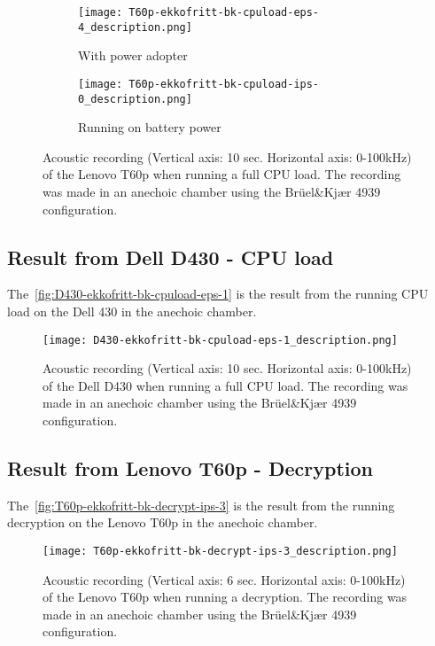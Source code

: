 \begin{figure}[ht]
	\begin{subfigure}{0.5\textwidth}
	    \centering
	    \texttt{[image: T60p-ekkofritt-bk-cpuload-eps-4\_description.png]}
	    \caption{With power adopter}
	    \label{fig:T60p-ekkofritt-bk-cpuload-eps-4}
    \end{subfigure}
    \begin{subfigure}{0.5\textwidth}
	    \centering
	    \texttt{[image: T60p-ekkofritt-bk-cpuload-ips-0\_description.png]}
	    \caption{Running on battery power}
	    \label{fig:T60p-ekkofritt-bk-cpuload-ips-0}
    \end{subfigure}
    \caption{Acoustic recording (Vertical axis: 10 sec. Horizontal axis: 0-100kHz) of the Lenovo T60p when running a full CPU load. The recording was made in an anechoic chamber using the Brüel\&Kjær 4939 configuration.}
	\label{fig:T60p-ekkofritt-bk-cpuload}
\end{figure}


\subsection{Result from Dell D430 - CPU load}\label{chp5:subsec:d430_bk_results_cpuload}

The~\autoref{fig:D430-ekkofritt-bk-cpuload-eps-1} is the result from the running CPU load on the Dell 430 in the anechoic chamber. 
\begin{figure}[ht]
    \centering
    \texttt{[image: D430-ekkofritt-bk-cpuload-eps-1\_description.png]}
    \caption{Acoustic recording (Vertical axis: 10 sec. Horizontal axis: 0-100kHz) of the Dell D430 when running a full CPU load. The recording was made in an anechoic chamber using the Brüel\&Kjær 4939 configuration. }
    \label{fig:D430-ekkofritt-bk-cpuload-eps-1}
\end{figure}


\subsection{Result from Lenovo T60p - Decryption}\label{chp5:subsec:t60p_bk_results_decryption}

The~\autoref{fig:T60p-ekkofritt-bk-decrypt-ips-3} is the result from the running decryption on the Lenovo T60p in the anechoic chamber. 
\begin{figure}[ht]
    \centering
    \texttt{[image: T60p-ekkofritt-bk-decrypt-ips-3\_description.png]}
    \caption{Acoustic recording (Vertical axis: 6 sec. Horizontal axis: 0-100kHz) of the Lenovo T60p when running a decryption. The recording was made in an anechoic chamber using the Brüel\&Kjær 4939 configuration. }
    \label{fig:T60p-ekkofritt-bk-decrypt-ips-3}
\end{figure}

